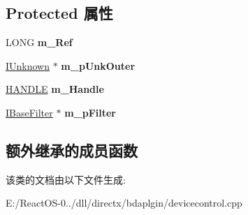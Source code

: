 \subsection*{Protected 属性}
\begin{DoxyCompactItemize}
\item 
\mbox{\label{class_c_b_d_a_device_control_a28dad3d0006ec940ea3f905993d8efda}} 
L\+O\+NG {\bfseries m\+\_\+\+Ref}
\item 
\mbox{\label{class_c_b_d_a_device_control_aacc6b73285941dc71b3ae6889f452be2}} 
\hyperlink{interface_i_unknown}{I\+Unknown} $\ast$ {\bfseries m\+\_\+p\+Unk\+Outer}
\item 
\mbox{\label{class_c_b_d_a_device_control_a32cc849b88ad2ddfa5da8200f4914a13}} 
\hyperlink{interfacevoid}{H\+A\+N\+D\+LE} {\bfseries m\+\_\+\+Handle}
\item 
\mbox{\label{class_c_b_d_a_device_control_ac235278f41ce4eac7a5fdbd45c659f03}} 
\hyperlink{interface_i_base_filter}{I\+Base\+Filter} $\ast$ {\bfseries m\+\_\+p\+Filter}
\end{DoxyCompactItemize}
\subsection*{额外继承的成员函数}


该类的文档由以下文件生成\+:\begin{DoxyCompactItemize}
\item 
E\+:/\+React\+O\+S-\/0../dll/directx/bdaplgin/devicecontrol.\+cpp\end{DoxyCompactItemize}
